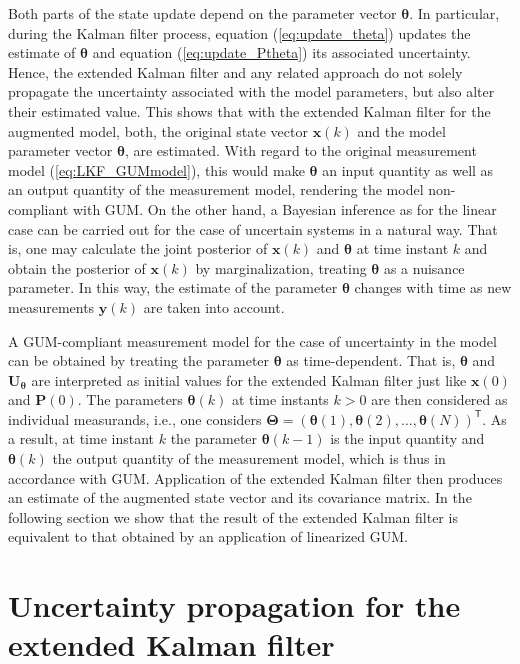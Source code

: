 \documentclass[10pt]{article}
\begin{document}
\begin{spacing}{1}
Both parts of the state update depend on the parameter vector $\bm{\theta}$. In particular, during the Kalman filter process, equation (\ref{eq:update_theta}) updates the estimate of $\bm{\theta}$ and equation (\ref{eq:update_Ptheta}) its associated uncertainty. Hence, the extended Kalman filter and any related approach do not solely propagate the uncertainty associated with the model parameters, but also alter their estimated value. This shows that with the extended Kalman filter for the augmented model, both, the original state vector $\bm{x}(k)$ and the model parameter vector $\bm{\theta}$, are estimated. With regard to the original measurement model (\ref{eq:LKF_GUMmodel}), this would make $\bm{\theta}$ an input quantity as well as an output quantity of the measurement model, rendering the model non-compliant with GUM. On the other hand, a Bayesian inference as for the linear case can be carried out for the case of uncertain systems in a natural way. That is, one may calculate the joint posterior of $\bm{x}(k)$ and $\bm{\theta}$ at time instant $k$ and obtain the posterior of $\bm{x}(k)$ by marginalization, treating $\bm{\theta}$ as a nuisance parameter. In this way, the estimate of the parameter $\bm{\theta}$ changes with time as new measurements $\bm{y}(k)$ are taken into account.

A GUM-compliant measurement model for the case of uncertainty in the model can be obtained by treating the parameter $\bm{\theta}$ as time-dependent. That is, $\bm{\theta}$ and $\bm{U}_{\bm{\theta}}$ are interpreted as initial values for the extended Kalman filter just like $\bm{x}(0)$ and $\bm{P}(0)$. The parameters $\bm{\theta}(k)$ at time instants $k>0$ are then considered as individual measurands, i.e., one considers $\bm{\Theta}=\left( \bm{\theta}(1),\bm{\theta}(2),\ldots,\bm{\theta}(N) \right)^{\mathsf{T}}$. As a result, at time instant $k$ the parameter $\bm{\theta}(k-1)$ is the input quantity and $\bm{\theta}(k)$ the output quantity of the measurement model, which is thus in accordance with GUM. Application of the extended Kalman filter then produces an estimate of the augmented state vector and its covariance matrix. In the following section we show that the result of the extended Kalman filter is equivalent to that obtained by an application of linearized GUM.


\section{Uncertainty propagation for the extended Kalman filter}
\label{sec:EKF}


\end{spacing}
\end{document}
